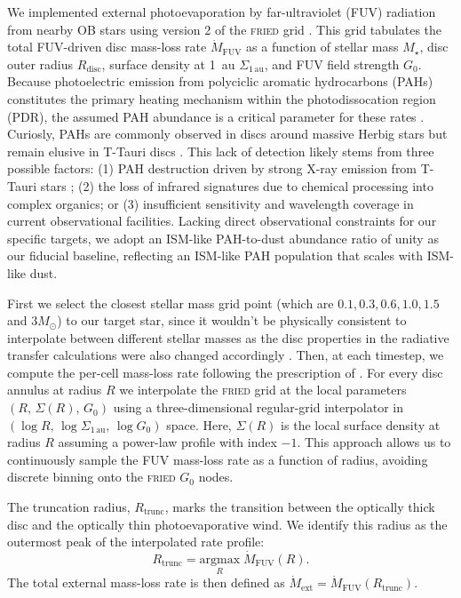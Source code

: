 \documentclass[fleqn,usenatbib]{mnras}
\begin{document}
We implemented external photoevaporation by far-ultraviolet (FUV) radiation from nearby OB stars using version 2 of the \textsc{fried} grid \citep{2018MNRAS.481..452H, 2023MNRAS.526.4315H}.
This grid tabulates the total FUV-driven disc mass-loss rate $\dot{M}_\mathrm{FUV}$ as a function of stellar mass $M_\star$, disc outer radius $R_\mathrm{disc}$, surface density at 1~au $\Sigma_{1\,\mathrm{au}}$, and FUV field strength $G_0$.
Because photoelectric emission from polyciclic aromatic hydrocarbons (PAHs) constitutes the primary heating mechanism within the photodissocation region (PDR), the assumed PAH abundance is a critical parameter for these rates \citep{2016MNRAS.457.3593F}.
Curiosly, PAHs are commonly observed in discs around massive Herbig stars but remain elusive in T-Tauri discs \citep[e.g.][]{2017ApJ...835..291S, 2006A&A...459..545G, 2007A&A...466..229V}.
This lack of detection likely stems from three possible factors: (1) PAH destruction driven by strong X-ray emission from T-Tauri stars \citep{2010A&A...511A...6S}; (2) the loss of infrared signatures due to chemical processing into complex organics; or (3) insufficient sensitivity and wavelength coverage in current observational facilities.
Lacking direct observational constraints for our specific targets, we adopt an ISM-like PAH-to-dust abundance ratio of unity as our fiducial baseline, reflecting an ISM-like PAH population that scales with ISM-like dust.

First we select the closest stellar mass grid point (which are $0.1, 0.3, 0.6, 1.0, 1.5$ and $3 M_\odot$) to our target star, since it wouldn't be physically consistent to interpolate between different stellar masses as the disc properties in the radiative transfer calculations were also changed accordingly \citep[for more details, see][]{2023MNRAS.526.4315H}.
Then, at each timestep, we compute the per-cell mass-loss rate following the prescription of \citet{2020MNRAS.492.1279S, 2024A&A...681A..84G}.
For every disc annulus at radius $R$ we interpolate the \textsc{fried} grid at the local parameters $(R,\,\Sigma(R),\,G_0)$ using a three-dimensional regular-grid interpolator in $(\log R,\,\log\Sigma_{1\,\mathrm{au}},\,\log G_0)$ space.
Here, $\Sigma(R)$ is the local surface density at radius $R$ assuming a power-law profile with index $-1$.
This approach allows us to continuously sample the FUV mass-loss rate as a function of radius, avoiding discrete binning onto the \textsc{fried} $G_0$ nodes.

The truncation radius, $R_\mathrm{trunc}$, marks the transition between the optically thick disc and the optically thin photoevaporative wind. We identify this radius as the outermost peak of the interpolated rate profile:
\begin{equation}
    R_\mathrm{trunc} = \underset{R}{\mathrm{argmax}}\;\dot{M}_\mathrm{FUV}(R).
\end{equation}
The total external mass-loss rate is then defined as $\dot{M}_\mathrm{ext} = \dot{M}_\mathrm{FUV}(R_\mathrm{trunc})$.
\end{document}
